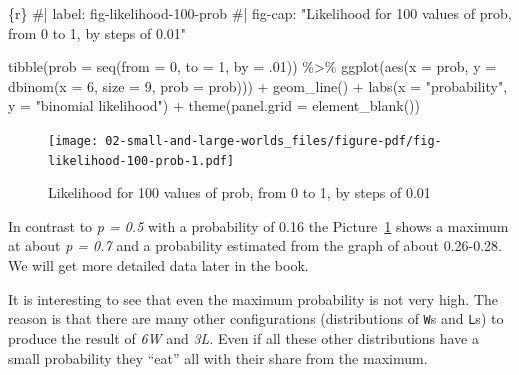 \documentclass[
  letterpaper,
  DIV=11,
  numbers=noendperiod]{scrreprt}
\newenvironment{Shaded}{\begin{snugshade}}{\end{snugshade}}
\newcommand{\AttributeTok}[1]{\textcolor[rgb]{0.40,0.45,0.13}{#1}}
\newcommand{\CommentTok}[1]{\textcolor[rgb]{0.37,0.37,0.37}{#1}}
\newcommand{\DecValTok}[1]{\textcolor[rgb]{0.68,0.00,0.00}{#1}}
\newcommand{\FunctionTok}[1]{\textcolor[rgb]{0.28,0.35,0.67}{#1}}
\newcommand{\InformationTok}[1]{\textcolor[rgb]{0.37,0.37,0.37}{#1}}
\newcommand{\NormalTok}[1]{\textcolor[rgb]{0.00,0.23,0.31}{#1}}
\newcommand{\SpecialCharTok}[1]{\textcolor[rgb]{0.37,0.37,0.37}{#1}}
\newcommand{\StringTok}[1]{\textcolor[rgb]{0.13,0.47,0.30}{#1}}
\begin{document}
\begin{Shaded}
\begin{Highlighting}[]
\InformationTok{\textasciigrave{}\textasciigrave{}\textasciigrave{}\{r\}}
\CommentTok{\#| label: fig{-}likelihood{-}100{-}prob}
\CommentTok{\#| fig{-}cap: "Likelihood for 100 values of prob, from 0 to 1, by steps of 0.01"}

\FunctionTok{tibble}\NormalTok{(}\AttributeTok{prob =} \FunctionTok{seq}\NormalTok{(}\AttributeTok{from =} \DecValTok{0}\NormalTok{, }\AttributeTok{to =} \DecValTok{1}\NormalTok{, }\AttributeTok{by =}\NormalTok{ .}\DecValTok{01}\NormalTok{)) }\SpecialCharTok{\%\textgreater{}\%} 
  \FunctionTok{ggplot}\NormalTok{(}\FunctionTok{aes}\NormalTok{(}\AttributeTok{x =}\NormalTok{ prob, }\AttributeTok{y =} \FunctionTok{dbinom}\NormalTok{(}\AttributeTok{x =} \DecValTok{6}\NormalTok{, }\AttributeTok{size =} \DecValTok{9}\NormalTok{, }\AttributeTok{prob =}\NormalTok{ prob))) }\SpecialCharTok{+}
  \FunctionTok{geom\_line}\NormalTok{() }\SpecialCharTok{+}
  \FunctionTok{labs}\NormalTok{(}\AttributeTok{x =} \StringTok{"probability"}\NormalTok{,}
       \AttributeTok{y =} \StringTok{"binomial likelihood"}\NormalTok{) }\SpecialCharTok{+}
  \FunctionTok{theme}\NormalTok{(}\AttributeTok{panel.grid =} \FunctionTok{element\_blank}\NormalTok{())}
\InformationTok{\textasciigrave{}\textasciigrave{}\textasciigrave{}}
\end{Highlighting}
\end{Shaded}

\begin{figure}[H]

{\centering \texttt{[image: 02-small-and-large-worlds\_files/figure-pdf/fig-likelihood-100-prob-1.pdf]}

}

\caption{\label{fig-likelihood-100-prob}Likelihood for 100 values of
prob, from 0 to 1, by steps of 0.01}

\end{figure}

In contrast to \emph{p = 0.5} with a probability of 0.16 the
Picture~\ref{fig-likelihood-100-prob} shows a maximum at about \emph{p =
0.7} and a probability estimated from the graph of about 0.26-0.28. We
will get more detailed data later in the book.

It is interesting to see that even the maximum probability is not very
high. The reason is that there are many other configurations
(distributions of \texttt{W}s and \texttt{L}s) to produce the result of
\emph{6W} and \emph{3L}. Even if all these other distributions have a
small probability they ``eat'' all with their share from the maximum.
\end{document}
